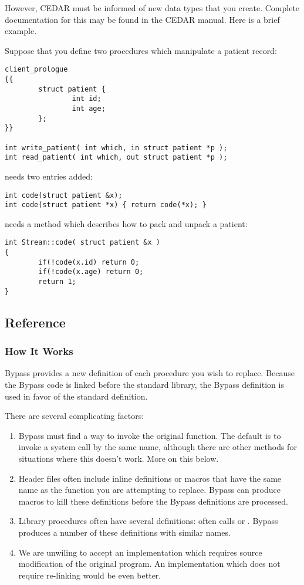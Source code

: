 However, CEDAR must be informed of new data types that you create.
Complete documentation for this may be found in the CEDAR manual.
Here is a brief example.

Suppose that you define two procedures which manipulate a patient record:

\begin{verbatim}
client_prologue
{{
        struct patient {
                int id;
                int age;
        };        
}}

int write_patient( int which, in struct patient *p );
int read_patient( int which, out struct patient *p );
\end{verbatim}

 needs two entries added:
\begin{verbatim}
int code(struct patient &x);
int code(struct patient *x) { return code(*x); }
\end{verbatim}

 needs a method which describes how to pack and unpack a patient:
\begin{verbatim}
int Stream::code( struct patient &x )
{
        if(!code(x.id) return 0;
        if(!code(x.age) return 0;
        return 1;
}
\end{verbatim}

\subsection{Reference}

\subsubsection{How It Works}

Bypass provides a new definition of each procedure you wish to replace.  Because the Bypass code is linked before the standard library, the Bypass definition is used in favor of the standard definition.

There are several complicating factors:
\begin{enumerate}
\item Bypass must find a way to invoke the original function.  The default is to invoke a system call by the same name, although there are other methods for situations where this doesn't work.  More on this below.
\item Header files often include inline definitions or macros that have the same name as the function you are attempting to replace.  Bypass can produce macros to kill these definitions before the Bypass definitions are processed.
\item Library procedures often have several definitions:  often calls  or .  Bypass produces a number of these definitions with similar names.
\item We are unwiling to accept an implementation which requires source modification of the original program.  An implementation which does not require re-linking would be even better.
\end{enumerate}


